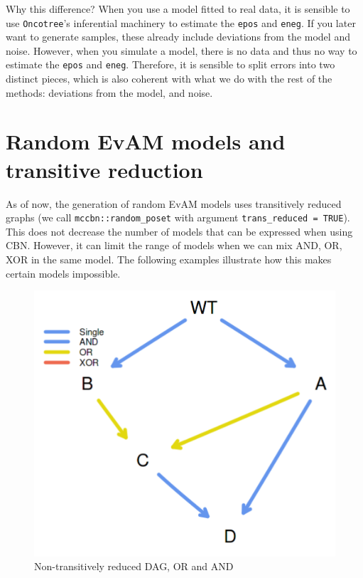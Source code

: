 \documentclass[a4paper,11pt]{article}
\begin{document}
Why this difference? When you use a model fitted to real data, it is sensible to use \texttt{Oncotree}'s inferential machinery to estimate the \texttt{epos} and \texttt{eneg}. If you later want to generate samples, these already include deviations from the model and noise. However, when you simulate a model, there is no data and thus no way to estimate the \texttt{epos} and \texttt{eneg}. Therefore, it is sensible to split errors into two distinct pieces, which is also coherent with what we do with the rest of the methods: deviations from the model, and noise.










\section{Random EvAM models and transitive reduction}
\label{sec:random-evam-models}

As of now, the generation of random EvAM models uses transitively reduced graphs (we call \texttt{mccbn::random\_poset} with argument \texttt{trans\_reduced = TRUE}). This does not decrease the number of models that can be expressed when using CBN. However, it can limit the range of models when we can mix AND, OR, XOR in the same model. The following  examples illustrate how this makes certain models impossible.

\begin{figure}[h!]
\centering
\includegraphics[width=.23\linewidth]{./dag2.png}
\caption{Non-transitively reduced DAG, OR and AND}\label{dag2}
\end{figure}
\end{document}
